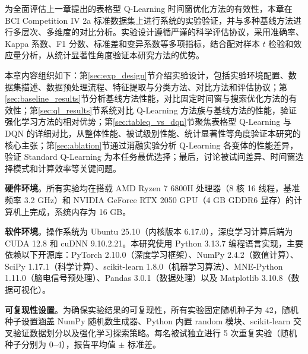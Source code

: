 
\label{chap:experiments}

为全面评估上一章提出的表格型 Q-Learning 时间窗优化方法的有效性，本章在 BCI Competition IV 2a 标准数据集上进行系统的实验验证，并与多种基线方法进行多层次、多维度的对比分析。实验设计遵循严谨的科学评估协议，采用准确率、Kappa 系数、F1 分数、标准差和变异系数等多项指标，结合配对样本 $t$ 检验和效应量分析，从统计显著性角度验证本研究方法的优势。

本章内容组织如下：第\ref{sec:exp_design}节介绍实验设计，包括实验环境配置、数据集描述、数据预处理流程、特征提取与分类方法、对比方法和评估协议；第\ref{sec:baseline_results}节分析基线方法性能，对比固定时间窗与搜索优化方法的有效性；第\ref{sec:ql_results}节系统对比 Q-Learning 方法族与基线方法的性能，验证强化学习方法的相对优势；第\ref{sec:tableq_vs_dqn}节聚焦表格型 Q-Learning 与 DQN 的详细对比，从整体性能、被试级别性能、统计显著性等角度验证本研究的核心主张；第\ref{sec:ablation}节通过消融实验分析 Q-Learning 各变体的性能差异，验证 Standard Q-Learning 为本任务最优选择；最后，讨论被试间差异、时间窗选择模式和计算效率等关键问题。

\label{sec:exp_design}

\label{subsec:experimental_setup}

\textbf{硬件环境}。所有实验均在搭载 AMD Ryzen 7 6800H 处理器（8 核 16 线程，基准频率 3.2 GHz）和 NVIDIA GeForce RTX 2050 GPU（4 GB GDDR6 显存）的计算机上完成，系统内存为 16 GB。

\textbf{软件环境}。操作系统为 Ubuntu 25.10（内核版本 6.17.0），深度学习计算后端为 CUDA 12.8 和 cuDNN 9.10.2.21。本研究使用 Python 3.13.7 编程语言实现，主要依赖以下开源库：PyTorch 2.10.0（深度学习框架）、NumPy 2.4.2（数值计算）、SciPy 1.17.1（科学计算）、scikit-learn 1.8.0（机器学习算法）、MNE-Python 1.11.0（脑电信号预处理）、Pandas 3.0.1（数据处理）以及 Matplotlib 3.10.8（数据可视化）。

\textbf{可复现性设置}。为确保实验结果的可复现性，所有实验固定随机种子为 42，随机种子设置涵盖 NumPy 随机数生成器、Python 内置 random 模块、scikit-learn 交叉验证数据划分以及强化学习探索策略。每名被试独立进行 5 次重复实验（随机种子分别为 0--4），报告平均值 $\pm$ 标准差。

